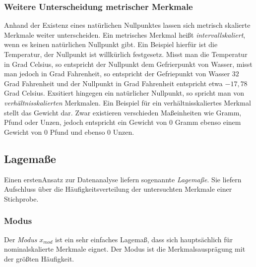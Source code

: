 \documentclass[fontsize=11pt]{scrartcl}
\begin{document}
                    \subsubsection{Weitere Unterscheidung metrischer Merkmale}
                        Anhand der Existenz eines natürlichen Nullpunktes lassen sich metrisch skalierte Merkmale weiter unterscheiden. Ein metrisches Merkmal heißt \emph{intervallskaliert}, wenn es keinen natürlichen Nullpunkt gibt. \cite{kohn2005} Ein Beispiel hierfür ist die Temperatur, der Nullpunkt ist willkürlich festgesetz. Misst man die Temperatur in Grad Celsius, so entspricht der Nullpunkt dem Gefrierpunkt von Wasser, misst man jedoch in Grad Fahrenheit, so entspricht der Gefriepunkt von Wasser $32$ Grad Fahrenheit und der Nullpunkt in Grad Fahrenheit entspricht etwa $-17,78$ Grad Celsius.
                        \newline
                        Exsitiert hingegen ein natürlicher Nullpunkt, so spricht man von \emph{verhältnisskalierten} Merkmalen. \cite{kohn2005}
                        \newline
                        Ein Beispiel für ein verhältnisskaliertes Merkmal stellt das Gewicht dar. Zwar existieren verschieden Maßeinheiten wie Gramm, Pfund oder Unzen, jedoch entspricht ein Gewicht von $0$ Gramm ebenso einem Gewicht von $0$ Pfund und ebenso $0$ Unzen.
                
                \subsection{Lagemaße}
                    Einen erstenAnsatz zur Datenanalyse liefern sogenannte \emph{Lagemaße}. Sie liefern Aufschluss über die Häufigkeitsverteilung der untersuchten Merkmale einer Stichprobe. \cite{kohn2005}
                    \subsubsection{Modus}
                        Der \emph{Modus} $x_{mod}$ ist ein sehr einfaches Lagemaß, dass sich hauptsächlich für nominalskalierte Merkmale eignet. Der Modus ist die Merkmalsausprägung mit der größten Häufigkeit. \cite{kohn2005}
\end{document}
